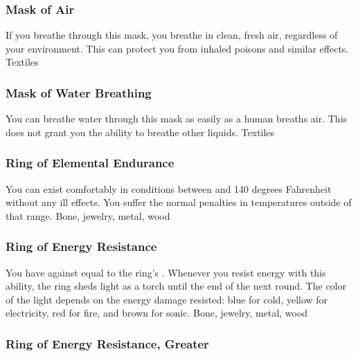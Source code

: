 \hypertarget{item:Mask of Air}{\subsubsection{Mask of Air\hfill{}}}
If you breathe through this mask, you breathe in clean, fresh air, regardless of your environment.
This can protect you from inhaled poisons and similar effects.
 
 Textiles
\lowercase{\hypertarget{item:Mask of Water Breathing}{}}\label{item:Mask of Water Breathing}
\hypertarget{item:Mask of Water Breathing}{\subsubsection{Mask of Water Breathing\hfill{}}}
You can breathe water through this mask as easily as a human breaths air.
This does not grant you the ability to breathe other liquids.
 
 Textiles
\lowercase{\hypertarget{item:Ring of Elemental Endurance}{}}\label{item:Ring of Elemental Endurance}
\hypertarget{item:Ring of Elemental Endurance}{\subsubsection{Ring of Elemental Endurance\hfill{}}}
You can exist comfortably in conditions between  and 140 degrees Fahrenheit without any ill effects.
You suffer the normal penalties in temperatures outside of that range.
 
 Bone, jewelry, metal, wood
\lowercase{\hypertarget{item:Ring of Energy Resistance}{}}\label{item:Ring of Energy Resistance}
\hypertarget{item:Ring of Energy Resistance}{\subsubsection{Ring of Energy Resistance\hfill{}}}
You have  against  equal to the ring's .
Whenever you resist energy with this ability, the ring sheds light as a torch until the end of the next round.
The color of the light depends on the energy damage resisted: blue for cold, yellow for electricity, red for fire, and brown for sonic.
 
 Bone, jewelry, metal, wood
\lowercase{\hypertarget{item:Ring of Energy Resistance, Greater}{}}\label{item:Ring of Energy Resistance, Greater}
\hypertarget{item:Ring of Energy Resistance, Greater}{\subsubsection{Ring of Energy Resistance, Greater\hfill{}}}
